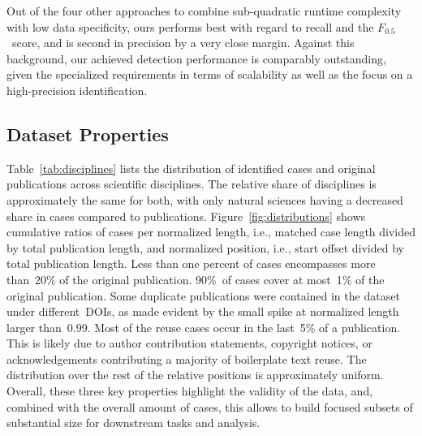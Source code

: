 Out of the four other approaches to combine sub-quadratic runtime complexity with low data specificity, ours performs best with regard to recall and the $F_{0.5}$~score, and is second in precision by a very close margin. Against this background, our achieved detection performance is comparably outstanding, given the specialized requirements in terms of scalability as well as the focus on a high-precision identification.


\subsection*{Dataset Properties}

Table~\ref{tab:disciplines} lists the distribution of identified cases and original publications across scientific disciplines. The relative share of disciplines is approximately the same for both, with only natural sciences having a decreased share in cases compared to publications. Figure~\ref{fig:distributions} shows cumulative ratios of cases per normalized length, i.e., matched case length divided by total publication length, and normalized position, i.e., start offset divided by total publication length. Less than one percent of cases encompasses more than~20\% of the original publication. 90\%~of cases cover at most~1\% of the original publication. Some duplicate publications were contained in the dataset under different~DOIs, as made evident by the small spike at normalized length larger than~0.99. Most of the reuse cases occur in the last~5\% of a publication. This is likely due to author contribution statements, copyright notices, or acknowledgements contributing a majority of boilerplate text reuse. The distribution over the rest of the relative positions is approximately uniform. Overall, these three key properties highlight the validity of the data, and, combined with the overall amount of cases, this allows to build focused subsets of substantial size for downstream tasks and analysis.

